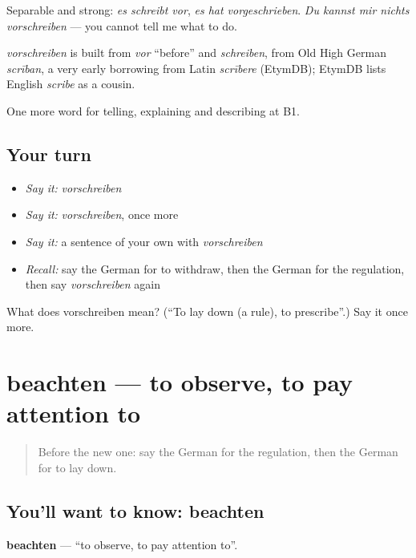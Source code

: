 Separable and strong: \emph{es schreibt vor}, \emph{es hat vorgeschrieben}. \emph{Du kannst mir nichts vorschreiben} — you cannot tell me what to do.

\begin{cousinweb}
\emph{vorschreiben} is built from \emph{vor} \textquotedblleft{}before\textquotedblright{} and \emph{schreiben}, from Old High German \emph{scrīban}, a very early borrowing from Latin \emph{scrībere} (EtymDB); EtymDB lists English \emph{scribe} as a cousin.
\end{cousinweb}

\begin{grammarlens}[title={What you've built}]
One more word for telling, explaining and describing at B1.
\end{grammarlens}

\subsection*{Your turn}
\begin{itemize}
\raggedright
  \item \emph{Say it:} \emph{vorschreiben}
  \item \emph{Say it:} \emph{vorschreiben}, once more
  \item \emph{Say it:} a sentence of your own with \emph{vorschreiben}
  \item \emph{Recall:} say the German for to withdraw, then the German for the regulation, then say \emph{vorschreiben} again
\end{itemize}

\begin{tcolorbox}[breakable,colback=teal!4,colframe=teal!35!black,title={Before you move on}]
What does vorschreiben mean? (\textquotedblleft{}To lay down (a rule), to prescribe\textquotedblright{}.) Say it once more.
\end{tcolorbox}
\section[beachten]{beachten — to observe, to pay attention to}

\label{lesson:GE-C381-beachten}



\begin{quote}
Before the new one: say the German for the regulation, then the German for to lay down.
\end{quote}

\subsection*{You'll want to know: beachten}
\textbf{beachten} — \textquotedblleft{}to observe, to pay attention to\textquotedblright{}.

